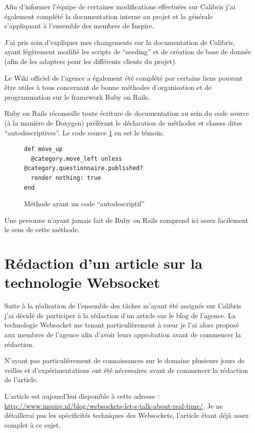 \documentclass[12pt,a4paper]{book}
\begin{document}
Afin d'informer l'équipe de certaines modifications effectuées sur Calibris j'ai également complété la documentation interne au projet et la générale s'appliquant à l'ensemble des membres de Inspire.

J'ai pris soin d'expliquer mes changements sur la documentation de Calibris, ayant légèrement modifié les scripts de ``seeding'' et de création de base de donnée (afin de les adapters pour les différents clients du projet).

Le Wiki officiel de l'agence a également été complété par certains liens pouvant être utiles à tous concernant de bonne méthodes d'organisation et de programmation sur le framework Ruby on Rails.

Ruby on Rails réconseille toute écriture de documentation au sein du code source (à la manière de Doxygen) préférant le déclaration de méthodes et classes dites ``autodescriptives''. Le code source \cref{fig.autodesc} en est le témoin.

  \begin{figure}[h]
  \lstset{language=ruby}
  \begin{lstlisting}
def move_up
  @category.move_left unless @category.questionnaire.published?
  render nothing: true
end 
  \end{lstlisting}
   \caption{Méthode ayant un code ``autodescriptif''}
  \label{fig.autodesc}
  \end{figure}
  
Une personne n'ayant jamais fait de Ruby on Rails comprend ici assez facilement le sens de cette méthode.

\section{Rédaction d'un article sur la technologie Websocket}

Suite à la réalisation de l'ensemble des tâches m'ayant été assignés sur Calibris j'ai décidé de participer à la rédaction d'un article sur le blog de l'agence. La technologie Websocket me tenant particulièrement à cœur je l'ai alors proposé aux membres de l'agence afin d'avoir leurs approbation avant de commencer la rédaction.

N'ayant pas particulièrement de connaissances sur le domaine plusieurs jours de veilles et d'expérimentations ont été nécessaires avant de commencer la rédaction de l'article.

L'article est aujourd'hui disponible à cette adresse : \url{http://www.inspire.nl/blog/websockets-let-s-talk-about-real-time/}. Je ne détaillerai pas les spécificités techniques des Websockets, l'article étant déjà assez complet à ce sujet.
\end{document}
